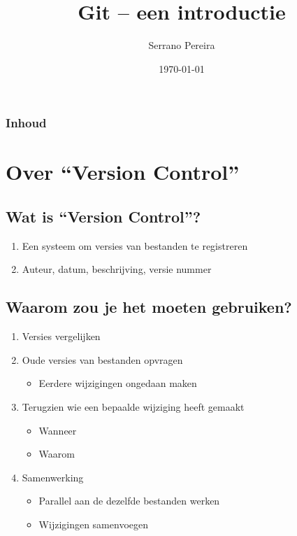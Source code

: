 \documentclass[]{beamer}
\title[Git]
{Git -- een introductie}
\author{Serrano Pereira}
\institute
{
  \inst{}
  Computest, Zoetermeer
}
\date{\today}
\begin{document}
\frame{\titlepage}
\note{}

\begin{frame}
\frametitle{Inhoud}
\tableofcontents
\end{frame}

\section{Over ``Version Control''}

\subsection{Wat is ``Version Control''?}

\begin{frame}
    \begin{enumerate}
    \item {Een systeem om versies van bestanden te registreren}
    \item {Auteur, datum, beschrijving, versie nummer}
    \end{enumerate}
\end{frame}

\subsection{Waarom zou je het moeten gebruiken?}

\begin{frame}
    \begin{enumerate}
    \item Versies vergelijken
    \item Oude versies van bestanden opvragen
        \begin{itemize}
        \item Eerdere wijzigingen ongedaan maken
        \end{itemize}
    \item {Terugzien wie een bepaalde wijziging heeft gemaakt}
        \begin{itemize}
        \item Wanneer
        \item Waarom
        \end{itemize}
    \item Samenwerking
        \begin{itemize}
        \item Parallel aan de dezelfde bestanden werken
        \item Wijzigingen samenvoegen
        \end{itemize}
    \end{enumerate}
\end{frame}
\end{document}

